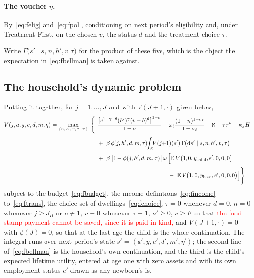 \documentclass[10pt]{article}
\begin{document}
\paragraph{The voucher $\eta$.} By~\eqref{eq:felig} and~\eqref{eq:fpol},
conditioning on next period's eligibility and, under Treatment First, on the
chosen $v$, the status $d$ and the treatment choice $\tau$.

Write $\Gamma\big(s'\mid s,\,n,h',v,\tau\big)$ for the product of these five,
which is the object the expectation in~\eqref{eq:fbellman} is taken against.

\subsection{The household's dynamic problem}\label{sec:fproblem}

Putting it together, for $j=1,\dots,J$ and with $V(J{+}1,\cdot)$ given below,
\begin{equation}\label{eq:fbellman}
\begin{aligned}
V(j,a,y,e,d,m,\eta)=\max_{\{n,\,h',\,v,\,\tau,\,a'\}}\ \Bigg\{\
&\frac{\big[c^{1-\gamma-\theta}(h')^{\gamma}(v+b)^{\theta}\big]^{1-\sigma}}{1-\sigma}
+\omega_{\ell}\frac{(1-n)^{1-\sigma_{\ell}}}{1-\sigma_{\ell}}
+\aleph-\tau\bar\tau^{u}-\kappa_x H\\[2pt]
&+\ \beta\,\phi(j,h',d,m,\tau)\!\!\int_{\mathcal S}\!\! V(j{+}1)(s')\,
\Gamma\big(\mathrm{d}s'\mid s,n,h',v,\tau\big)\\[2pt]
&+\ \beta\,\big[1-\phi(j,h',d,m,\tau)\big]\,\omega\,
\Big[\mathbb{E}\,V\big(1,0,y_{\text{child}},e',0,0,0\big)\\[2pt]
&\hphantom{+\ \beta\,\big[1-\phi(j,h',d,m,\tau)\big]\,\omega\,\Big[}
-\ \mathbb{E}\,V\big(1,0,y_{\text{base}},e',0,0,0\big)\Big]\Bigg\}
\end{aligned}
\end{equation}
subject to the budget~\eqref{eq:fbudget}, the income
definitions~\eqref{eq:fincome} to~\eqref{eq:ftrans}, the choice
set of dwellings~\eqref{eq:fchoice}, $\tau=0$ whenever $d=0$, $n=0$
whenever $j\ge J_R$ or
$e\neq1$, $v=0$ whenever $\tau=1$, $a'\ge0$, $c\ge F$ so that \textcolor{red}{the food stamp payment cannot be saved, since it is paid in kind,} and $V(J{+}1,\cdot)=0$
with $\phi(J)=0$, so that at the last age the
child is the whole continuation. The integral runs over next period's
state $s'=(a',y,e',d',m',\eta')$; the second line of~\eqref{eq:fbellman} is the
household's own continuation, and the third is the child's expected lifetime
utility, entered at age one with zero assets and with its own employment status
$e'$ drawn as any newborn's is.
\end{document}
